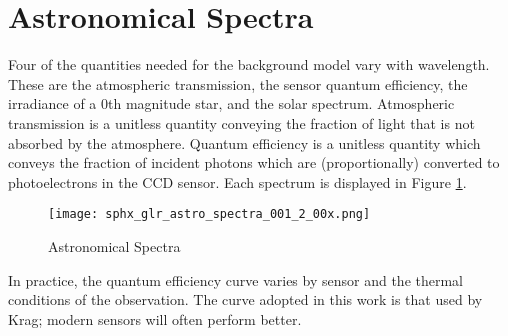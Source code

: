 \section{Astronomical Spectra}

Four of the quantities needed for the background model vary with wavelength. These are the atmospheric
transmission, the sensor quantum efficiency, the irradiance of a 0th magnitude star, and the solar spectrum. Atmospheric transmission is a unitless quantity
conveying the fraction of light that is not absorbed by the atmosphere. Quantum efficiency is a
unitless quantity which conveys the fraction of incident photons which are (proportionally) converted
to photoelectrons in the CCD sensor. Each spectrum is displayed in Figure \ref{fig:spectra}.  

\begin{figure}[ht]
  \centering
  \texttt{[image: sphx\_glr\_astro\_spectra\_001\_2\_00x.png]}
  \caption{Astronomical Spectra}
  \label{fig:spectra}
\end{figure}

In practice, the quantum efficiency curve varies by sensor and the thermal conditions of the
observation. The curve adopted in this work is that used by Krag; modern sensors will often
perform better.

